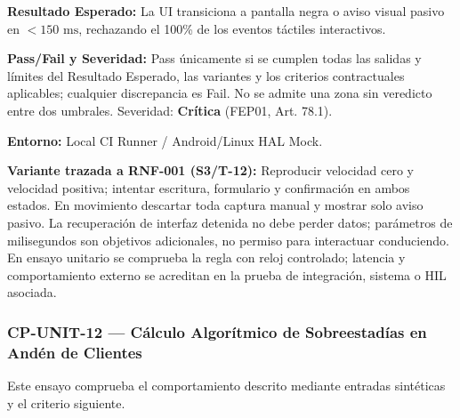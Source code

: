 \par\noindent\textbf{Resultado Esperado:} La UI transiciona a pantalla negra o aviso visual pasivo en \(< 150\text{ ms}\), rechazando el 100\% de los eventos táctiles interactivos.\par
\par\noindent\textbf{Pass/Fail y Severidad:} Pass únicamente si se cumplen todas las salidas y límites del Resultado Esperado, las variantes y los criterios contractuales aplicables; cualquier discrepancia es Fail. No se admite una zona sin veredicto entre dos umbrales. Severidad: \textbf{Crítica} (FEP01, Art. 78.1).\par
\par\noindent\textbf{Entorno:} Local CI Runner / Android/Linux HAL Mock.\par







\par\noindent\textbf{Variante trazada a RNF-001 (S3/T-12):} Reproducir velocidad cero y velocidad positiva; intentar escritura, formulario y confirmación en ambos estados. En movimiento descartar toda captura manual y mostrar solo aviso pasivo. La recuperación de interfaz detenida no debe perder datos; parámetros de milisegundos son objetivos adicionales, no permiso para interactuar conduciendo. En ensayo unitario se comprueba la regla con reloj controlado; latencia y comportamiento externo se acreditan en la prueba de integración, sistema o HIL asociada.\par
\subsubsection*{CP-UNIT-12 — Cálculo Algorítmico de Sobreestadías en Andén de Clientes}\label{sec:9-cp-unit-12}
Este ensayo comprueba el comportamiento descrito mediante entradas sintéticas y el criterio siguiente.

